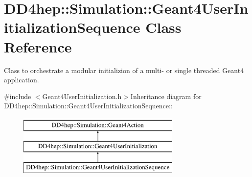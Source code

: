 \hypertarget{class_d_d4hep_1_1_simulation_1_1_geant4_user_initialization_sequence}{
\section{DD4hep::Simulation::Geant4UserInitializationSequence Class Reference}
\label{class_d_d4hep_1_1_simulation_1_1_geant4_user_initialization_sequence}
}


Class to orchestrate a modular initializion of a multi-\/ or single threaded Geant4 application.  


{\ttfamily \#include $<$Geant4UserInitialization.h$>$}Inheritance diagram for DD4hep::Simulation::Geant4UserInitializationSequence::\begin{figure}[H]
\begin{center}
\leavevmode
\includegraphics[height=3cm]{class_d_d4hep_1_1_simulation_1_1_geant4_user_initialization_sequence}
\end{center}
\end{figure}
